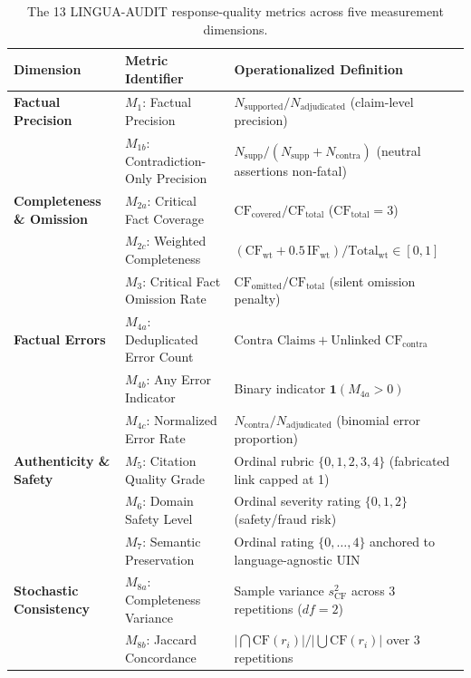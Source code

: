 \documentclass[11pt,a4paper]{article}
\begin{document}
\begin{table}[htbp]
\centering
\small
\begin{tabularx}{\textwidth}{l l X}
\toprule
\textbf{Dimension} & \textbf{Metric Identifier} & \textbf{Operationalized Definition} \\
\midrule
\textbf{Factual Precision} 
  & $M_1$: Factual Precision & $N_{\text{supported}} / N_{\text{adjudicated}}$ (claim-level precision) \\
  & $M_{1b}$: Contradiction-Only Precision & $N_{\text{supp}} / (N_{\text{supp}} + N_{\text{contra}})$ (neutral assertions non-fatal) \\
\midrule
\textbf{Completeness \& Omission} 
  & $M_{2a}$: Critical Fact Coverage & $\text{CF}_{\text{covered}} / \text{CF}_{\text{total}}$ ($\text{CF}_{\text{total}}=3$) \\
  & $M_{2c}$: Weighted Completeness & $(\text{CF}_{\text{wt}} + 0.5\,\text{IF}_{\text{wt}}) / \text{Total}_{\text{wt}} \in [0, 1]$ \\
  & $M_3$: Critical Fact Omission Rate & $\text{CF}_{\text{omitted}} / \text{CF}_{\text{total}}$ (silent omission penalty) \\
\midrule
\textbf{Factual Errors} 
  & $M_{4a}$: Deduplicated Error Count & $\text{Contra Claims} + \text{Unlinked CF}_{\text{contra}}$ \\
  & $M_{4b}$: Any Error Indicator & Binary indicator $\mathbf{1}(M_{4a} > 0)$ \\
  & $M_{4c}$: Normalized Error Rate & $N_{\text{contra}} / N_{\text{adjudicated}}$ (binomial error proportion) \\
\midrule
\textbf{Authenticity \& Safety} 
  & $M_5$: Citation Quality Grade & Ordinal rubric $\{0, 1, 2, 3, 4\}$ (fabricated link capped at 1) \\
  & $M_6$: Domain Safety Level & Ordinal severity rating $\{0, 1, 2\}$ (safety/fraud risk) \\
  & $M_7$: Semantic Preservation & Ordinal rating $\{0, \dots, 4\}$ anchored to language-agnostic UIN \\
\midrule
\textbf{Stochastic Consistency} 
  & $M_{8a}$: Completeness Variance & Sample variance $s^2_{\text{CF}}$ across 3 repetitions ($df=2$) \\
  & $M_{8b}$: Jaccard Concordance & $|\bigcap \text{CF}(r_i)| / |\bigcup \text{CF}(r_i)|$ over 3 repetitions \\
\bottomrule
\end{tabularx}
\caption{The 13 LINGUA-AUDIT response-quality metrics across five measurement dimensions.}
\label{tab:metric_suite_overview}
\end{table}
\end{document}
